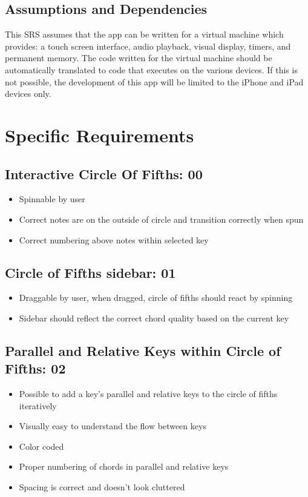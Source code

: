 \documentclass[onecolumn, draftclsnofoot,10pt, compsoc]{IEEEtran}
\begin{document}
\subsection{Assumptions and Dependencies}
\par
This SRS assumes that the app can be written for a virtual machine which provides: a touch screen interface, audio playback, visual display, timers, and permanent memory.
The code written for the virtual machine should be automatically translated to code that executes on the various devices.
If this is not possible, the development of this app will be limited to the iPhone and iPad devices only.

\section{Specific Requirements}

\subsection{Interactive Circle Of Fifths: 00}
\begin{itemize}
\item Spinnable by user
\item Correct notes are on the outside of circle and transition correctly when spun
\item Correct numbering above notes within selected key
\end{itemize}

\subsection{Circle of Fifths sidebar: 01}
\begin{itemize}
\item Draggable by user, when dragged, circle of fifths should react by spinning
\item Sidebar should reflect the correct chord quality based on the current key
\end{itemize}

\subsection{Parallel and Relative Keys within Circle of Fifths: 02}
\begin{itemize}
\item Possible to add a key’s parallel and relative keys to the circle of fifths iteratively
\item Visually easy to understand the flow between keys
\item Color coded
\item Proper numbering of chords in parallel and relative keys
\item Spacing is correct and doesn’t look cluttered
\end{itemize}
\end{document}
